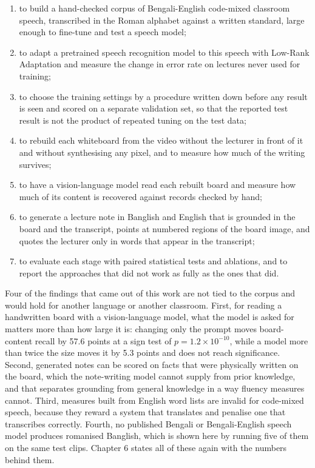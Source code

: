 \begin{enumerate}
  \item to build a hand-checked corpus of Bengali-English code-mixed classroom speech,
        transcribed in the Roman alphabet against a written standard, large enough to
        fine-tune and test a speech model;
  \item to adapt a pretrained speech recognition model to this speech with Low-Rank
        Adaptation and measure the change in error rate on lectures never used for
        training;
  \item to choose the training settings by a procedure written down before any result is
        seen and scored on a separate validation set, so that the reported test result is
        not the product of repeated tuning on the test data;
  \item to rebuild each whiteboard from the video without the lecturer in front of it and
        without synthesising any pixel, and to measure how much of the writing survives;
  \item to have a vision-language model read each rebuilt board and measure how much of
        its content is recovered against records checked by hand;
  \item to generate a lecture note in Banglish and English that is grounded in the board
        and the transcript, points at numbered regions of the board image, and quotes the
        lecturer only in words that appear in the transcript;
  \item to evaluate each stage with paired statistical tests and ablations, and to report
        the approaches that did not work as fully as the ones that did.
\end{enumerate}

Four of the findings that came out of this work are not tied to the corpus and would hold
for another language or another classroom. First, for reading a handwritten board with a
vision-language model, what the model is asked for matters more than how large it is:
changing only the prompt moves board-content recall by 57.6 points at a sign test of
$p = 1.2 \times 10^{-10}$, while a model more than twice the size moves it by 5.3 points
and does not reach significance. Second, generated notes can be
scored on facts that were physically written on the board, which the note-writing model
cannot supply from prior knowledge, and that separates grounding from general knowledge in
a way fluency measures cannot. Third, measures built from English word lists are invalid
for code-mixed speech, because they reward a system that translates and penalise one that
transcribes correctly. Fourth, no published Bengali or Bengali-English speech model
produces romanised Banglish, which is shown here by running five of them on the same test
clips. Chapter 6 states all of these again with the numbers behind them.

